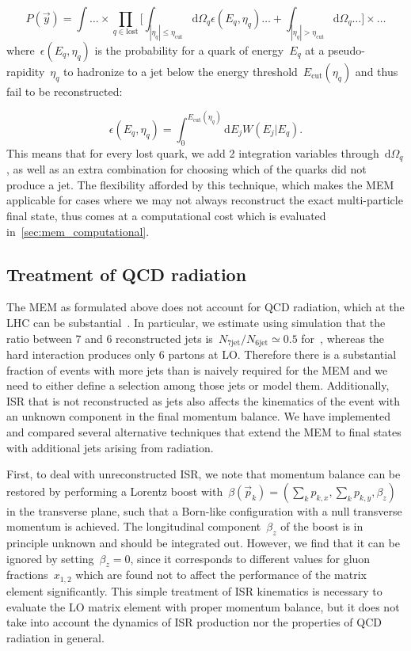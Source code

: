 \begin{equation}
P(\vec{y}) = \int \dots \times \prod_{q\in\mathrm{lost}} \biggl[ \int_{|\eta_q| \leq \eta_{\mathrm{cut}}} \mathrm{d}\Omega_q \epsilon(E_q, \eta_q) \dots + \int_{|\eta_q| > \eta_{\mathrm{cut}}} \mathrm{d}\Omega_q \dots \biggr] \times \dots
\end{equation}
where~$\epsilon(E_q, \eta_q)$ is the probability for a quark of energy~$E_q$ at a pseudo-rapidity~$\eta_q$ to hadronize to a jet below the energy threshold~$E_{\mathrm{cut}}(\eta_q)$ and thus fail to be reconstructed:

\begin{equation}
\epsilon(E_q, \eta_q) = \int_0^{E_{\mathrm{cut}}(\eta_q)} \mathrm{d}E_j W(E_j | E_q).
\end{equation}
This means that for every lost quark, we add 2 integration variables through~$\mathrm{d}\Omega_q$, as well as an extra combination for choosing which of the quarks did not produce a jet. The flexibility afforded by this technique, which makes the MEM applicable for cases where we may not always reconstruct the exact multi-particle final state, thus comes at a computational cost which is evaluated in~\cref{sec:mem_computational}.

\subsection{Treatment of QCD radiation}
\label{sec:mem_radiation}

The MEM as formulated above does not account for QCD radiation, which at the LHC can be substantial~\cite{Alwall:2010cq}. In particular, we estimate using simulation that the ratio between 7 and 6 reconstructed jets is~$N_{7\mathrm{jet}}/N_{6\mathrm{jet}} \simeq 0.5$ for~\ttHbb, whereas the hard interaction produces only 6 partons at LO. Therefore there is a substantial fraction of events with more jets than is naively required for the MEM and we need to either define a selection among those jets or model them. Additionally, ISR that is not reconstructed as jets also affects the kinematics of the event with an unknown component in the final momentum balance. We have implemented and compared several alternative techniques that extend the MEM to final states with additional jets arising from radiation.

First, to deal with unreconstructed ISR, we note that momentum balance can be restored by performing a Lorentz boost with~$\beta(\vec{p}_k) = (\sum_k p_{k,x}, \sum_k p_{k,y}, \beta_z)$ in the transverse plane, such that a Born-like configuration with a null transverse momentum is achieved. The longitudinal component~$\beta_z$ of the boost is in principle unknown and should be integrated out. However, we find that it can be ignored by setting~$\beta_z = 0$, since it corresponds to different values for gluon fractions~$x_{1,2}$ which are found not to affect the performance of the matrix element significantly. This simple treatment of ISR kinematics is necessary to evaluate the LO matrix element with proper momentum balance, but it does not take into account the dynamics of ISR production nor the properties of QCD radiation in general.

